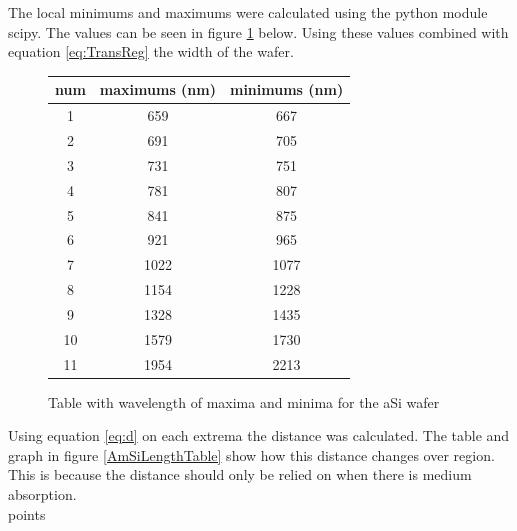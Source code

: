 \documentclass[10pt,a4paper]{article}
\begin{document}
\begin{multicols}{2}
The local minimums and maximums were calculated using the python module scipy. The values can be seen in figure \ref{AmSiTranTable} below. Using these values combined with equation \ref{eq:TransReg} the width of the wafer.


\begin{figure}[H]
\label{AmSiTranTable}
\begin{tabular}{ |c|c|c| } 
\hline
num & maximums (nm) & minimums (nm)\\
\hline
 1 & 659  & 667\\
 2 & 691  & 705\\
 3 & 731  & 751\\
 4 & 781  & 807\\
 5 & 841  & 875\\
 6 & 921  & 965\\
 7 & 1022 & 1077\\
 8 & 1154 & 1228\\
 9 & 1328 & 1435\\
 10& 1579 & 1730\\
 11& 1954 & 2213\\
\hline
\end{tabular}
\caption{Table with wavelength of maxima and minima for the aSi wafer}
\end{figure}

Using equation \ref{eq:d} on each extrema the distance was calculated. The table and graph in figure \ref{AmSiLengthTable} show how this distance changes over region. This is because the distance should only be relied on when there is medium absorption.\\
 points 
\begin{figure}[H]\centering\label{AmSiLengthGraphwithError}


\end{figure}
\end{multicols}
\end{document}

